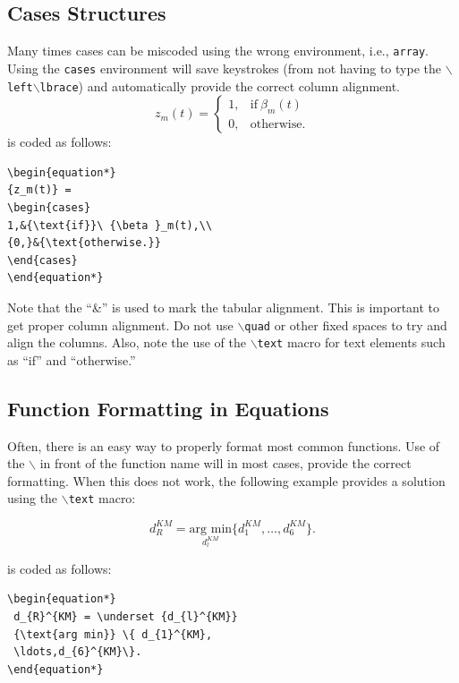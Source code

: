\subsection{Cases Structures}
Many times cases can be miscoded using the wrong environment, i.e., {\tt{array}}. Using the {\tt{cases}} environment will save keystrokes (from not having to type the $\backslash${\tt{left}}$\backslash${\tt{lbrace}}) and automatically provide the correct column alignment.
\begin{equation*}
{z_m(t)} = \begin{cases}
1,&{\text{if}}\ {\beta }_m(t) \\ 
{0,}&{\text{otherwise.}} 
\end{cases}
\end{equation*}
\noindent is coded as follows:
\begin{verbatim}
\begin{equation*}
{z_m(t)} = 
\begin{cases}
1,&{\text{if}}\ {\beta }_m(t),\\ 
{0,}&{\text{otherwise.}} 
\end{cases}
\end{equation*}
\end{verbatim}
\noindent Note that the ``\&'' is used to mark the tabular alignment. This is important to get  proper column alignment. Do not use $\backslash${\tt{quad}} or other fixed spaces to try and align the columns. Also, note the use of the $\backslash${\tt{text}} macro for text elements such as ``if'' and ``otherwise.''

\subsection{Function Formatting in Equations}
Often, there is an easy way to properly format most common functions. Use of the $\backslash$ in front of the function name will in most cases, provide the correct formatting. When this does not work, the following example provides a solution using the $\backslash${\tt{text}} macro:

\begin{equation*} 
  d_{R}^{KM} = \underset {d_{l}^{KM}} {\text{arg min}} \{ d_{1}^{KM},\ldots,d_{6}^{KM}\}.
\end{equation*}

\noindent is coded as follows:
\begin{verbatim}
\begin{equation*} 
 d_{R}^{KM} = \underset {d_{l}^{KM}} 
 {\text{arg min}} \{ d_{1}^{KM},
 \ldots,d_{6}^{KM}\}.
\end{equation*}
\end{verbatim}

